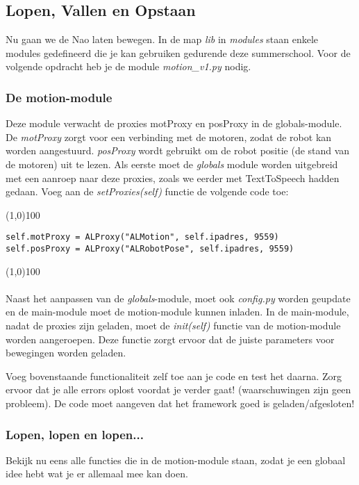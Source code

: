\documentclass[a4paper]{article}
\begin{document}
\subsection{Lopen, Vallen en Opstaan}
Nu gaan we de Nao laten bewegen.
In de map \textit{lib} in \textit{modules} staan enkele modules gedefineerd die je kan gebruiken gedurende deze summerschool.
Voor de volgende opdracht heb je de module \textit{motion\_v1.py} nodig.

\subsubsection{De motion-module}
Deze module verwacht de proxies motProxy en posProxy in de globals-module. De \textit{motProxy} zorgt voor een verbinding met de motoren, zodat de robot kan worden aangestuurd. \textit{posProxy} wordt gebruikt om de robot positie (de stand van de motoren) uit te lezen. Als eerste moet de \textit{globals} module worden uitgebreid met een aanroep naar deze proxies, zoals we eerder met TextToSpeech hadden gedaan.
Voeg aan de \textit{setProxies(self)} functie de volgende code toe:

\noindent \line(1,0){100}
\begin{verbatim}
self.motProxy = ALProxy("ALMotion", self.ipadres, 9559)
self.posProxy = ALProxy("ALRobotPose", self.ipadres, 9559)
\end{verbatim}
\noindent \line(1,0){100}
\\\\

Naast het aanpassen van de \textit{globals}-module, moet ook \textit{config.py} worden geupdate en de main-module moet de motion-module kunnen inladen.
In de main-module, nadat de proxies zijn geladen, moet de \textit{init(self)} functie van de motion-module worden aangeroepen. Deze functie zorgt ervoor dat de juiste parameters voor bewegingen worden geladen.

Voeg bovenstaande functionaliteit zelf toe aan je code en test het daarna. Zorg ervoor dat je alle errors oplost voordat je verder gaat! (waarschuwingen zijn geen probleem). De code moet aangeven dat het framework goed is geladen/afgesloten!

\subsubsection{Lopen, lopen en lopen...}
Bekijk nu eens alle functies die in de motion-module staan, zodat je een globaal idee hebt wat je er allemaal mee kan doen.
\end{document}
